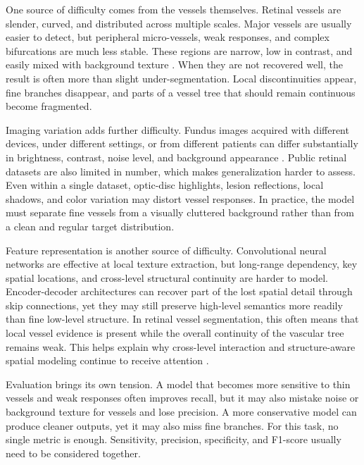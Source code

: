 \documentclass[a4paper,11pt]{article}
\begin{document}
One source of difficulty comes from the vessels themselves. Retinal vessels are slender, curved, and distributed across multiple scales. Major vessels are usually easier to detect, but peripheral micro-vessels, weak responses, and complex bifurcations are much less stable. These regions are narrow, low in contrast, and easily mixed with background texture \cite{staal2004drive,hoover2000locating}. When they are not recovered well, the result is often more than slight under-segmentation. Local discontinuities appear, fine branches disappear, and parts of a vessel tree that should remain continuous become fragmented.

Imaging variation adds further difficulty. Fundus images acquired with different devices, under different settings, or from different patients can differ substantially in brightness, contrast, noise level, and background appearance \cite{fraz2012ensemble,budai2013robust}. Public retinal datasets are also limited in number, which makes generalization harder to assess. Even within a single dataset, optic-disc highlights, lesion reflections, local shadows, and color variation may distort vessel responses. In practice, the model must separate fine vessels from a visually cluttered background rather than from a clean and regular target distribution.

Feature representation is another source of difficulty. Convolutional neural networks are effective at local texture extraction, but long-range dependency, key spatial locations, and cross-level structural continuity are harder to model. Encoder-decoder architectures can recover part of the lost spatial detail through skip connections, yet they may still preserve high-level semantics more readily than fine low-level structure. In retinal vessel segmentation, this often means that local vessel evidence is present while the overall continuity of the vascular tree remains weak. This helps explain why cross-level interaction and structure-aware spatial modeling continue to receive attention \cite{zhu2021deformabledetr,zhu2019dcnv2,hou2021coordatt}.

Evaluation brings its own tension. A model that becomes more sensitive to thin vessels and weak responses often improves recall, but it may also mistake noise or background texture for vessels and lose precision. A more conservative model can produce cleaner outputs, yet it may also miss fine branches. For this task, no single metric is enough. Sensitivity, precision, specificity, and F1-score usually need to be considered together.
\end{document}
